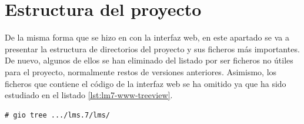 \section{Estructura del proyecto}

De la misma forma que se hizo en con la interfaz web, en este apartado se va a presentar la estructura de directorios del proyecto y sus ficheros más importantes. De nuevo, algunos de ellos se han eliminado del listado por ser ficheros no útiles para el proyecto, normalmente restos de versiones anteriores. Asimismo, los ficheros que contiene el código de la interfaz web se ha omitido ya que ha sido estudiado en el listado \ref{lst:lm7-www-treeview}. \\

\begin{lstlisting}[label={lst:lm7-www-treeview}, caption={Estructura de directorios y ficheros de la interfaz web}]
    # gio tree .../lms.7/lms/


\end{lstlisting}
